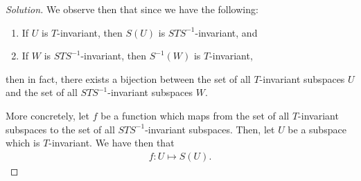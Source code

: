 \documentclass{article}
\newenvironment{solution}{\begin{proof}[Solution]}{\end{proof}}
\begin{document}
\begin{solution}
	We observe then that since we have the following:
	\begin{enumerate}
		\item If $U$ is $T$-invariant, then $S(U)$ is $STS^{-1}$-invariant, and
		\item If $W$ is $STS^{-1}$-invariant, then $S^{-1}(W)$ is $T$-invariant,
	\end{enumerate}
	then in fact, there exists a bijection between the set of all $T$-invariant subspaces $U$ and the set of all $STS^{-1}$-invariant subspaces $W$.
	
	More concretely, let $f$ be a function which maps from the set of all $T$-invariant subspaces to the set of all $STS^{-1}$-invariant subspaces. Then, let $U$ be a subspace which is $T$-invariant. We have then that
	\begin{align*}
		f : U \mapsto S(U).
	\end{align*}
	
	\end{solution}
	
\end{document}

